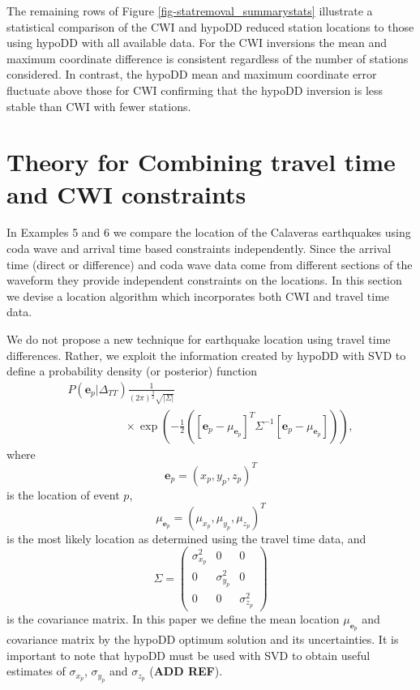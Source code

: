 \documentclass[extra]{gji}
\begin{document}
The remaining rows of Figure \ref{fig-statremoval_summarystats}
illustrate a statistical comparison of the CWI and hypoDD reduced
station locations to those using hypoDD with all available data. For
the CWI inversions the mean and maximum coordinate difference is
consistent regardless of the number of stations considered. In
contrast, the hypoDD mean and maximum coordinate error fluctuate
above those for CWI confirming that the hypoDD inversion is less
stable than CWI with fewer stations.

\section{Theory for Combining travel time and CWI constraints}
\label{sec:CalaverasLoc-CWIandTT}
In Examples 5 and 6 we compare the location of the Calaveras
earthquakes using coda wave and arrival time based constraints
independently. Since the arrival time (direct or difference) and
coda wave data
 come from different sections of the waveform they provide independent constraints on the locations.
 In this section we devise a location algorithm which incorporates
 both CWI and travel time data.

We do not propose a new technique for earthquake location using
travel time differences. Rather, we exploit the information created
by hypoDD with SVD to define a probability density (or posterior)
function
\begin{equation}
\label{eq-multi-var-Gauss-tt}
\begin{array}{l}
P(\mathbf{e}_p|\Delta_{TT})
\frac{1}{(2\pi)^{\frac{3}{2}}\sqrt{|\Sigma|}} \\
\hspace{5em} \times \exp
\left({-\frac{1}{2}\left([\mathbf{e}_p-\mu_{\mathbf{e}_p}]^T
\Sigma^{-1} [\mathbf{e}_p-\mu_{\mathbf{e}_p}]\right)} \right),
\end{array}
\end{equation}
where
\begin{equation}
\mathbf{e}_p = (x_p,y_p,z_p)^T
\end{equation}
is the location of event $p$,
\begin{equation}
\mu_{\mathbf{e}_p} = (\mu_{x_p}, \mu_{y_p},\mu_{z_p})^T
\end{equation}
is the most likely location as determined using the travel time
data, and
\begin{equation}
\label{eq:Sigma-expression}
\Sigma = \left( \begin{array}{ccc} \sigma_{x_p}^2 & 0 & 0\\
0 &  \sigma_{y_p}^2 & 0 \\
0 & 0 & \sigma_{z_p}^2  \end{array} \right)
\end{equation}
is the covariance matrix. In this paper we define the mean location
$\mu_{\mathbf{e}_p}$ and covariance matrix by the hypoDD optimum
solution and its uncertainties. It is important to note that hypoDD
must be used with SVD to obtain useful estimates of $\sigma_{x_p}$,
$\sigma_{y_p}$ and $\sigma_{z_p}$ (\textbf{ADD REF}).
\end{document}
